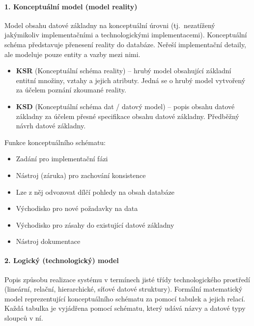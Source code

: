 \documentclass[12pt,a4paper]{article}
\begin{document}
\paragraph{1. Konceptuální model (model reality)}
Model obsahu datové základny na konceptuální úrovni (tj.~nezatížený jakýmikoliv implementačními
a technologickými implementacemi). Konceptuální schéma představuje přenesení reality do databáze.
Neřeší implementační detaily, ale modeluje pouze entity a vazby mezi nimi.
\begin{itemize}
  \item \textbf{KSR} (Konceptuální schéma reality) -- hrubý model obsahující základní entitní množiny,
    vztahy a jejich atributy. Jedná se o hrubý model vytvořený za účelem poznání zkoumané reality.
  \item \textbf{KSD} (Konceptuální schéma dat / datový model) -- popis obsahu datové základny za účelem
    přesné specifikace obsahu datové základny. Předběžný návrh datové základny.
\end{itemize}

Funkce konceptuálního schématu:
\begin{itemize}
  \item Zadání pro implementační fázi
  \item Nástroj (záruka) pro zachování konsistence
  \item Lze z něj odvozovat dílčí pohledy na obsah databáze
  \item Východisko pro nové požadavky na data
  \item Východisko pro zásahy do existující datové základny
  \item Nástroj dokumentace
\end{itemize}

\paragraph{2. Logický (technologický) model}
Popis způsobu realizace systému v termínech jisté třídy technologického prostředí (lineární, relační,
hierarchické, síťové datové struktury). Formální matematický model reprezentující konceptuálního
schématu za pomocí tabulek a jejich relací. Každá tabulka je vyjádřena pomocí schématu, který udává
názvy a datové typy sloupců v ní.
\end{document}
